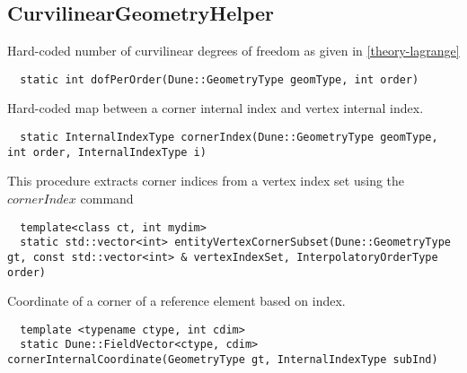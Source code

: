 \subsection{CurvilinearGeometryHelper}
\label{interface-geometry-helper}


\noindent
Hard-coded number of curvilinear degrees of freedom as given in \ref{theory-lagrange} \\

\begin{mybox}
\begin{lstlisting}
  static int dofPerOrder(Dune::GeometryType geomType, int order)
\end{lstlisting}
\end{mybox}

\noindent
Hard-coded map between a corner internal index and vertex internal index. \\

\begin{mybox}
\begin{lstlisting}
  static InternalIndexType cornerIndex(Dune::GeometryType geomType, int order, InternalIndexType i)
\end{lstlisting}
\end{mybox}

\noindent
This procedure extracts corner indices from a vertex index set using the $cornerIndex$ command \\

\begin{mybox}
\begin{lstlisting}
  template<class ct, int mydim>
  static std::vector<int> entityVertexCornerSubset(Dune::GeometryType gt, const std::vector<int> & vertexIndexSet, InterpolatoryOrderType order)
\end{lstlisting}
\end{mybox}

\noindent
Coordinate of a corner of a reference element based on index. \\ %

\begin{mybox}
\begin{lstlisting}
  template <typename ctype, int cdim>
  static Dune::FieldVector<ctype, cdim> cornerInternalCoordinate(GeometryType gt, InternalIndexType subInd)
\end{lstlisting}
\end{mybox}

